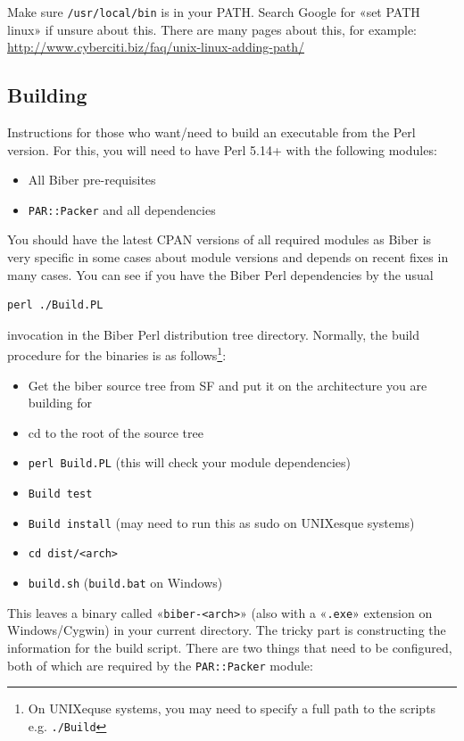 \documentclass{ltxdockit}
\begin{document}
\noindent Make sure \verb+/usr/local/bin+ is in your PATH. Search Google for «set PATH
linux» if unsure about this. There are many pages about this, for example:
\url{http://www.cyberciti.biz/faq/unix-linux-adding-path/}


\subsection{Building}

Instructions for those who want/need to build an executable from the
Perl version. For this, you will need to have Perl 5.14+ with
the following modules:

\begin{itemize}
\item All Biber pre-requisites
\item \verb+PAR::Packer+ and all dependencies
\end{itemize}

\noindent You should have the latest CPAN versions of all required modules
as Biber is very specific in some cases about module versions and
depends on recent fixes in many cases. You can see if you have the
Biber Perl dependencies by the usual

\begin{verbatim}
perl ./Build.PL
\end{verbatim}

\noindent invocation in the Biber Perl distribution tree
directory. Normally, the build procedure for the binaries is as
follows\footnote{On UNIXequse systems, you may need to specify a full
  path to the scripts e.g. \texttt{./Build}}:

\begin{itemize}
\item Get the biber source tree from SF and put it on the architecture
  you are building for
\item cd to the root of the source tree
\item \verb+perl Build.PL+ (this will check your module
  dependencies)
\item \verb+Build test+
\item \verb+Build install+ (may need to run this as sudo on
  UNIXesque systems)
\item \verb+cd dist/<arch>+
\item \verb+build.sh+ (\verb+build.bat+ on Windows)
\end{itemize}

\noindent This leaves a binary called «\verb+biber-<arch>+» (also with
a «\verb+.exe+» extension on Windows/Cygwin) in your current directory.
The tricky part is constructing the information for the build
script. There are two things that need to be configured, both of
which are required by the \verb+PAR::Packer+ module:
\end{document}
